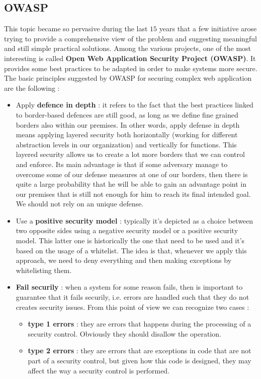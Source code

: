 \subsection{OWASP}
This topic became so pervasive during the last $15$ years that a few initiative arose trying to provide a comprehensive view of the problem and suggesting meaningful and still simple practical solutions. Among the various projects, one of the most interesting is called \textbf{Open Web Application Security Project (OWASP)}. It provides some best practices to be adapted in order to make systems more secure. The basic principles suggested by OWASP for securing complex web application are the following :
\begin{itemize}
\item Apply \textbf{defence in depth} : it refers to the fact that the best practices linked to border-based defences are still good, as long as we define fine grained borders also within our premises. In other words, apply defense in depth means applying layered security both horizontally (working for different abstraction levels in our organization) and vertically for functions. This layered security allows us to create a lot more borders that we can control and enforce. Its main advantage is that if some adversary manage to overcome some of our defense measures at one of our borders, then there is quite a large probability that he will be able to gain an advantage point in our premises that is still not enough for him to reach its final intended goal. We should not rely on an unique defense.
\item Use a \textbf{positive security model} : typically it's depicted as a choice between two opposite sides using a negative security model or a positive security model. This latter one is historically the one that need to be used and it's based on the usage of a whitelist. The idea is that, whenever we apply this approach, we need to deny everything and then making exceptions by whitelisting them.
\item \textbf{Fail securily} : when a system for some reason fails, then is important to guarantee that it fails securily, i.e. errors are handled such that they do not creates security issues. From this point of view we can recognize two cases :
\begin{itemize}
\item \textbf{type 1 errors} : they are errors that happens during the processing of a security control. Obviously they should disallow the operation.
\item \textbf{type 2 errors} : they are errors that are exceptions in code that are not part of a security control, but given how this code is designed, they may affect the way a security control is performed.

\end{itemize}
\end{itemize}
